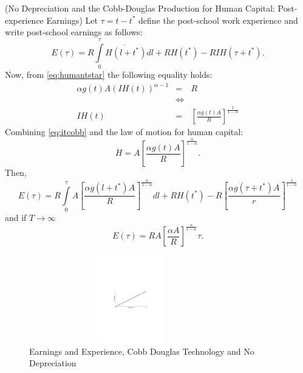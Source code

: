 \begin{case} (No Depreciation and the Cobb-Douglas Production for Human Capital: Post-experience Earnings)
Let $\tau = t - t^*$ define the post-school work experience and write post-school earnings as follows:
\begin{equation}
E(\tau) = R \int \limits _{0} ^{\tau} \dot{H( l + t^*)}d l + R H(t^*) - RIH(\tau + t^*).
\end{equation}
Now, from \eqref{eq:humantstar} the following equality holds:
\begin{eqnarray}
\alpha g(t) A \left( IH(t) \right)^{\alpha - 1} &=& R \nonumber \\
&\Leftrightarrow& \nonumber \\
IH(t) &=& \left[ \frac{\alpha g(t) A}{R} \right]^{\frac{1}{1-\alpha}} \label{eq:itcobb}
\end{eqnarray}
Combining \eqref{eq:itcobb} and the law of motion for human capital:
\begin{equation}
\dot{H} = A \left[ \frac{\alpha g(t) A}{R} \right]^{\frac{\alpha}{1-\alpha}} \label{eq:hdot}.
\end{equation}
Then,
\begin{equation}
E(\tau) = R \int \limits _{0} ^{\tau} A \left[ \frac{\alpha g(l + t^*) A}{R} \right]^{\frac{\alpha}{1-\alpha}} dl + RH(t^*) - R \left[ \frac{\alpha g \left( \tau + t^* \right) A}{r} \right]^{\frac{1}{1-\alpha}} \label{equation:postearnings}
\end{equation}
and if $T \rightarrow \infty$
\begin{equation}
E(\tau) = RA \left[ \frac{\alpha A}{R} \right]^{\frac{\alpha}{1-\alpha}} \tau.
\end{equation}

\begin{center}
\begin{figure}[H]
\caption{Earnings and Experience, Cobb Douglas Technology and No Depreciation}
\centering
\includegraphics[width=3.5in, height=1.5in]{Figures/fig-earnings-experience.pdf}
\end{figure}
\end{center}

\end{case}

